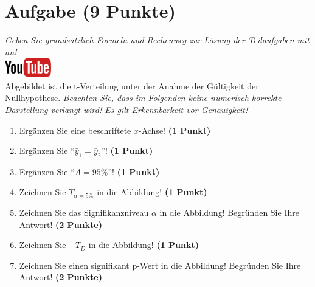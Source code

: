 \documentclass[a4paper, 9pt]{scrartcl}\usepackage[]{graphicx}\usepackage[]{xcolor}
\begin{document}
\section{Aufgabe \hfill (9 Punkte)}

\textit{Geben Sie grunds{\"a}tzlich Formeln und Rechenweg zur L{\"o}sung der
  Teilaufgaben mit an!} \\[1Ex]

\hfill\href{https://youtu.be/32JjH1eyuTU}{\includegraphics[width =
  2cm]{img/youtube}}\\[1Ex]



Abgebildet ist die t-Verteilung unter der Anahme der G{\"u}ltigkeit der
Nullhypothese. \textit{Beachten Sie, dass im Folgenden keine
  numerisch korrekte Darstellung verlangt wird! Es gilt Erkennbarkeit vor
  Genauigkeit!}

\begin{enumerate}
\item Erg{\"a}nzen Sie eine beschriftete $x$-Achse! \textbf{(1 Punkt)}
\item Erg{\"a}nzen Sie "`$\bar{y}_1 = \bar{y}_2$"'! \textbf{(1 Punkt)} 
\item Erg{\"a}nzen Sie "`$A = 95\%$"'! \textbf{(1 Punkt)}
\item Zeichnen Sie $T_{\alpha=5\%}$ in die Abbildung! \textbf{(1 Punkt)} 
\item Zeichnen Sie das Signifikanzniveau $\alpha$ in die Abbildung! Begr{\"u}nden
  Sie Ihre Antwort! \textbf{(2 Punkte)} 
\item Zeichnen Sie $-T_{D}$ in die Abbildung! \textbf{(1
    Punkt)}
\item Zeichnen Sie einen signifikant p-Wert in die Abbildung! Begr{\"u}nden
  Sie Ihre Antwort! \textbf{(2 Punkte)}   
\end{enumerate}
\end{document}
